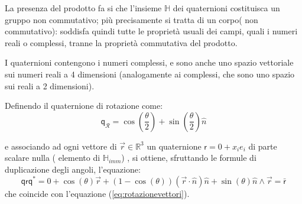 \documentclass[11pt]{report}
\theoremstyle{plain}
\theoremstyle{definition}
\theoremstyle{remark}
\begin{document}
La presenza del prodotto fa si che l'insieme $\mathbb{H}$ dei quaternioni costituisca un gruppo non commutativo; più precisamente si tratta di un corpo( non commutativo): soddisfa quindi tutte le proprietà usuali dei campi, quali i numeri reali o complessi, tranne la proprietà commutativa del prodotto.

I quaternioni contengono i numeri complessi, e sono anche uno spazio vettoriale sui numeri reali a 4 dimensioni (analogamente ai complessi, che sono uno spazio sui reali a 2 dimensioni).







Definendo il quaternione di rotazione come:
\begin{equation}\label{eq:rotquaternio}
\mathsf{q}_{\mathscr{R}} = \cos(\frac{\theta}{2}) + \sin(\frac{\theta}{2})\hat{n}
\end{equation}

e  associando ad ogni vettore di $\vec{r} \in \mathbb{R}^{3}$ un quaternione $\mathsf{r}= 0 +x_{i} e_{i}$ di parte scalare nulla ( elemento di $\mathbb{H}_{imm}$) , si ottiene, sfruttando le formule di duplicazione degli angoli, l'equazione:
\begin{equation}\label{eq:azionequaternioni}
\mathsf{q}\mathsf{r}\mathsf{q}^{*} = 0 + \cos(\theta)\vec{r} + (1 -\cos(\theta))(\vec{r}\cdot \hat{n})\hat{n} + \sin(\theta) \hat{n}\wedge\vec{r} = \bar{\mathsf{r}}
\end{equation}
che coincide con l'equazione (\ref{eq:rotazionevettori}).
\end{document}
